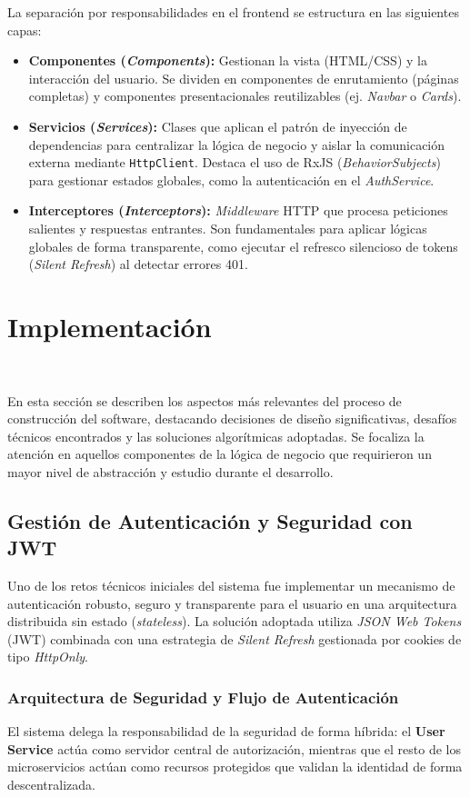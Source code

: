         La separación por responsabilidades en el frontend se estructura en las siguientes capas:
        \begin{itemize}
            \item \textbf{Componentes (\textit{Components}):} Gestionan la vista (HTML/CSS) y la interacción del usuario. Se dividen en componentes de enrutamiento (páginas completas) y componentes presentacionales reutilizables (ej. \textit{Navbar} o \textit{Cards}).
            \item \textbf{Servicios (\textit{Services}):} Clases que aplican el patrón de inyección de dependencias \cite{fowler2004} para centralizar la lógica de negocio y aislar la comunicación externa mediante \texttt{HttpClient}. Destaca el uso de RxJS (\textit{BehaviorSubjects}) para gestionar estados globales, como la autenticación en el \textit{AuthService}.
            \item \textbf{Interceptores (\textit{Interceptors}):} \textit{Middleware} HTTP que procesa peticiones salientes y respuestas entrantes. Son fundamentales para aplicar lógicas globales de forma transparente, como ejecutar el refresco silencioso de tokens (\textit{Silent Refresh}) al detectar errores 401.
        \end{itemize}
\section{Implementación} 
\label{sec:implementacion}

En esta sección se describen los aspectos más relevantes del proceso de construcción del software, destacando decisiones de diseño significativas, desafíos técnicos encontrados y las soluciones algorítmicas adoptadas. Se focaliza la atención en aquellos componentes de la lógica de negocio que requirieron un mayor nivel de abstracción y estudio durante el desarrollo.

\subsection{Gestión de Autenticación y Seguridad con JWT}
Uno de los retos técnicos iniciales del sistema fue implementar un mecanismo de autenticación robusto, seguro y transparente para el usuario en una arquitectura distribuida sin estado (\textit{stateless}). La solución adoptada utiliza \textit{JSON Web Tokens} (JWT) combinada con una estrategia de \textit{Silent Refresh} gestionada por cookies de tipo \textit{HttpOnly}.

\subsubsection{Arquitectura de Seguridad y Flujo de Autenticación}
El sistema delega la responsabilidad de la seguridad de forma híbrida: el \textbf{User Service} actúa como servidor central de autorización, mientras que el resto de los microservicios actúan como recursos protegidos que validan la identidad de forma descentralizada.

